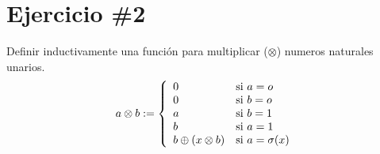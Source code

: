 \documentclass{article}
\begin{document}
\section*{Ejercicio \#2}
Definir inductivamente una funci\'on para multiplicar ($\otimes$) numeros naturales unarios.
\[
        a\otimes b := \left\{
        \begin{array}{l l}
            0 & \mbox{si } a=o \\
            0 & \mbox{si } b=o \\
            a & \mbox{si } b=1 \\
            b & \mbox{si } a=1 \\
            b\oplus(x\otimes b) & \mbox{si } a=\sigma(x) \\
        \end{array}
        \right.
    \]
\end{document}
